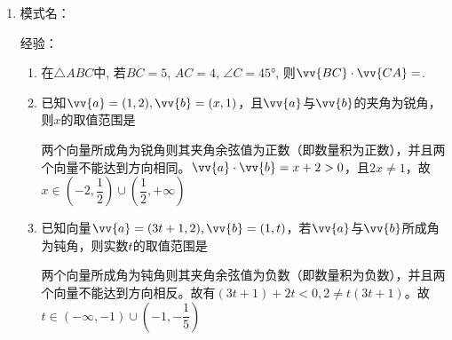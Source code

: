 \begin{enumerate}
\begin{enumerate}
        \item 在$\triangle{ABC}$中, 点$P$是$AB$上一点, $\vv{CP}=\dfrac{2}{3}\vv{CA}+\dfrac{1}{3}\vv{CB}$, $Q$是$BC$中点, $AQ$与$CP$交点为$M$, $\vv{CM}=t\vv{CP}$, 则$t=$
        \begin{jieda}
            $\vv{CM} = \lambda \vv{CA} + (1-\lambda) \vv{CQ} = \lambda \vv{CA} + \dfrac{1-\lambda}{2} \vv{CB}$，因此$\vv{CP} = \dfrac{\lambda}{t} \vv{CA} + \dfrac{1-\lambda}{2t} \vv{CB}$，由平面向量基本定理可推得$\dfrac{1-\lambda}{2t} = \dfrac{1}{2} \cdot \dfrac{\lambda}{t}$，因此$\lambda = \dfrac{1}{2}$，即$\vv{CM} = \dfrac{1}{2}\vv{CA} + \dfrac{1}{4}\vv{CB}$，因此$t = \dfrac{3}{4}$
        \end{jieda}
    \end{enumerate}
    \item 模式名：

    经验：
    
    \begin{enumerate}
        \item 在$\triangle{ABC}$中, 若$BC=5$, $AC=4$, $\angle{C}=\ang{45}$, 则$\vv{BC}\cdot\vv{CA}=$.
        
        \item 已知$\vv{a} = (1, 2), \vv{b} = (x, 1)$，且$\vv{a}$与$\vv{b}$的夹角为锐角，则$x$的取值范围是
        \begin{jieda}
            两个向量所成角为锐角则其夹角余弦值为正数（即数量积为正数），并且两个向量不能达到方向相同。$\vv{a} \cdot \vv{b} = x+2 > 0$，且$2x \neq 1$，故$x \in (-2, \dfrac{1}{2}) \cup (\dfrac{1}{2}, +\infty)$
        \end{jieda}
        \item 已知向量$\vv{a} = (3t+1, 2), \vv{b} = (1, t)$，若$\vv{a}$与$\vv{b}$所成角为钝角，则实数$t$的取值范围是
        \begin{jieda}
            两个向量所成角为钝角则其夹角余弦值为负数（即数量积为负数），并且两个向量不能达到方向相反。故有$(3t+1) + 2t < 0, 2 \neq t(3t+1)$。故$t \in (-\infty, -1) \cup (-1, -\dfrac{1}{5})$
        \end{jieda}
    \end{enumerate}
    

\end{enumerate}
